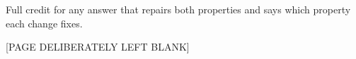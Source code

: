 \documentclass[addpoints]{exam}
\begin{document}
\begin{questions}
\begin{parts}
\begin{solution}
    Full credit for any answer that repairs both properties and says
    which property each change fixes.
  \end{solution}
\end{parts}

\newpage
\begin{center}
  [PAGE DELIBERATELY LEFT BLANK]
\end{center}
\newpage







\end{questions}
\end{document}
